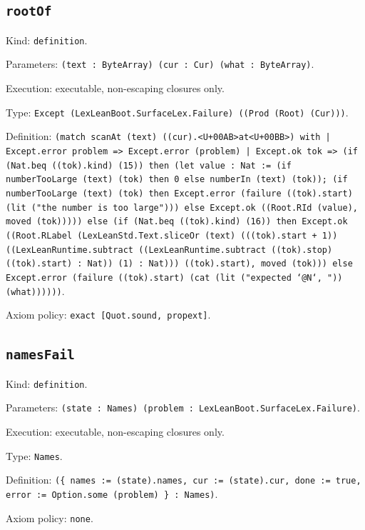 \documentclass[11pt]{article}
\begin{document}
\subsection*{\texttt{rootOf}}
\noindent Kind: \texttt{definition}.\par
\noindent Parameters: \texttt{(text : ByteArray) (cur : Cur) (what : ByteArray)}.\par
\noindent Execution: executable, non-escaping closures only.\par
\noindent Type: \texttt{Except (LexLeanBoot.SurfaceLex.Failure) ((Prod (Root) (Cur)))}.\par
\noindent Definition: \texttt{(match scanAt (text) ((cur).<U+00AB>at<U+00BB>) with | Except.error problem => Except.error (problem) | Except.ok tok => (if (Nat.beq ((tok).kind) (15)) then (let value : Nat := (if numberTooLarge (text) (tok) then 0 else numberIn (text) (tok)); (if numberTooLarge (text) (tok) then Except.error (failure ((tok).start) (lit ("the number is too large"))) else Except.ok ((Root.RId (value), moved (tok))))) else (if (Nat.beq ((tok).kind) (16)) then Except.ok ((Root.RLabel (LexLeanStd.Text.sliceOr (text) (((tok).start + 1)) ((LexLeanRuntime.subtract ((LexLeanRuntime.subtract ((tok).stop) ((tok).start) : Nat)) (1) : Nat))) ((tok).start), moved (tok))) else Except.error (failure ((tok).start) (cat (lit ("expected `@N`, ")) (what))))))}.\par
\noindent Axiom policy: \texttt{exact [Quot.sound, propext]}.\par
\subsection*{\texttt{namesFail}}
\noindent Kind: \texttt{definition}.\par
\noindent Parameters: \texttt{(state : Names) (problem : LexLeanBoot.SurfaceLex.Failure)}.\par
\noindent Execution: executable, non-escaping closures only.\par
\noindent Type: \texttt{Names}.\par
\noindent Definition: \texttt{(\{ names := (state).names, cur := (state).cur, done := true, error := Option.some (problem) \} : Names)}.\par
\noindent Axiom policy: \texttt{none}.\par
\end{document}
